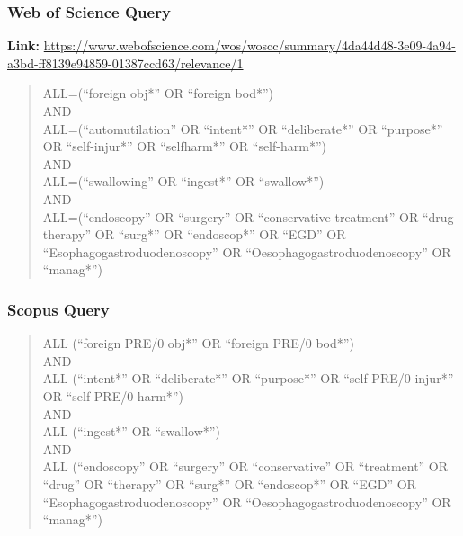 \subsubsection{Web of Science Query}
\textbf{Link:} \url{https://www.webofscience.com/wos/woscc/summary/4da44d48-3e09-4a94-a3bd-ff8139e94859-01387ccd63/relevance/1}
\begin{quote}
ALL=(\enquote{foreign obj*} OR \enquote{foreign bod*})\\
AND\\
ALL=(\enquote{automutilation} OR \enquote{intent*} OR \enquote{deliberate*} OR \enquote{purpose*} OR \enquote{self-injur*} OR \enquote{selfharm*} OR \enquote{self-harm*})\\
AND\\
ALL=(\enquote{swallowing} OR \enquote{ingest*} OR \enquote{swallow*})\\
AND\\
ALL=(\enquote{endoscopy} OR \enquote{surgery} OR \enquote{conservative treatment} OR \enquote{drug therapy} OR \enquote{surg*} OR \enquote{endoscop*} OR \enquote{EGD} OR \enquote{Esophagogastroduodenoscopy} OR \enquote{Oesophagogastroduodenoscopy} OR \enquote{manag*})
\end{quote}

\subsubsection{Scopus Query}
\begin{quote}
ALL (\enquote{foreign PRE/0 obj*} OR \enquote{foreign PRE/0 bod*})\\
AND\\
ALL (\enquote{intent*} OR \enquote{deliberate*} OR \enquote{purpose*} OR \enquote{self PRE/0 injur*} OR \enquote{self PRE/0 harm*})\\
AND\\
ALL (\enquote{ingest*} OR \enquote{swallow*})\\
AND\\
ALL (\enquote{endoscopy} OR \enquote{surgery} OR \enquote{conservative} OR \enquote{treatment} OR \enquote{drug} OR \enquote{therapy} OR \enquote{surg*} OR \enquote{endoscop*} OR \enquote{EGD} OR \enquote{Esophagogastroduodenoscopy} OR \enquote{Oesophagogastroduodenoscopy} OR \enquote{manag*})
\end{quote}

\clearpage


